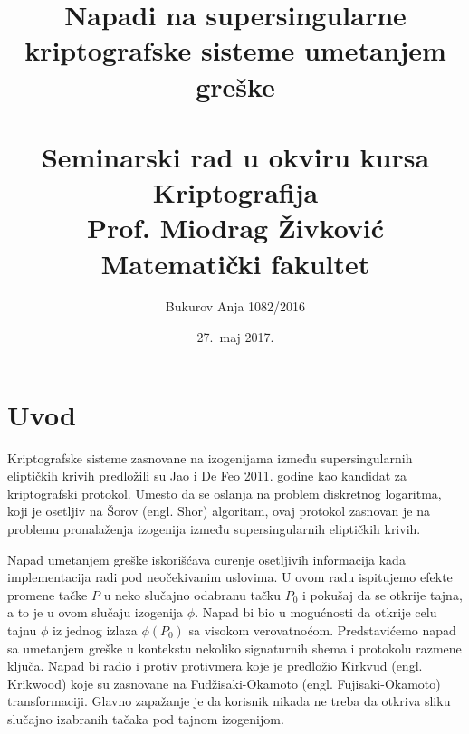 \documentclass[a4paper]{article}
\begin{document}
\title{Napadi na supersingularne kriptografske sisteme umetanjem greške\\ \small{~\\Seminarski rad u okviru kursa Kriptografija\\ Prof. Miodrag Živković\\Matematički fakultet}}

\author{Bukurov Anja 1082/2016}
\date{27.~maj 2017.}
\maketitle


\tableofcontents

\newpage

\section{Uvod}

Kriptografske sisteme zasnovane na izogenijama između supersingularnih eliptičkih krivih predložili su Jao i De Feo 2011. godine kao kandidat za kriptografski protokol. Umesto da se oslanja na problem diskretnog logaritma, koji je osetljiv na Šorov (engl. Shor) algoritam, ovaj protokol zasnovan je na problemu pronalaženja izogenija između supersingularnih eliptičkih krivih.

Napad umetanjem greške iskorišćava curenje osetljivih informacija kada implementacija radi pod neočekivanim uslovima. U ovom radu ispitujemo efekte promene tačke $P$ u neko slučajno odabranu tačku $P_0$ i pokušaj da se otkrije tajna, a to je u ovom slučaju izogenija $\phi$. Napad bi bio u mogućnosti da otkrije celu tajnu $\phi$ iz jednog izlaza $\phi(P_0)$ sa visokom verovatnoćom. Predstavićemo napad sa umetanjem greške u kontekstu nekoliko signaturnih shema i protokolu razmene ključa. Napad bi radio i protiv protivmera koje je predložio Kirkvud (engl. Krikwood) koje su zasnovane na Fudžisaki-Okamoto (engl. Fujisaki-Okamoto) transformaciji. Glavno zapažanje je da korisnik nikada ne treba da otkriva sliku slučajno izabranih tačaka pod tajnom izogenijom. 
\end{document}
